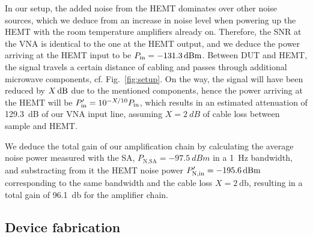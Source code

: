 In our setup, the added noise from the HEMT dominates over other noise sources, which we deduce from an increase in noise level when powering up the HEMT with the room temperature amplifiers already on.
% 
Therefore, the SNR at the VNA is identical to the one at the HEMT output, and we deduce the power arriving at the HEMT input to be $P_{\rm in}=\SI{-131.3}{dBm}$. 
% 
Between DUT and HEMT, the signal travels a certain distance of cabling and passes through additional microwave components, cf. Fig.~\ref{fig:setup}.
% 
On the way, the signal will have been reduced by $X {\,\rm dB}$ due to the mentioned components, hence the power arriving at the HEMT will be $P_{\rm in}^\prime = 10^{-X/10} P_{\rm in}$, which results in an estimated attenuation of \SI{129.3}{dB} of our VNA input line, assuming $X=\SI{2}{dB}$ of cable loss between sample and HEMT.

We deduce the total gain of our amplification chain by calculating the average noise power measured with the SA, $P_\text{N,SA}=\SI{-97.5}{dBm}$ in a \SI{1}{\hertz} bandwidth, and substracting from it the HEMT noise power $P_{\rm N,in}^\prime=\SI{-195.6}{dBm}$ corresponding to the same bandwidth and the cable loss $X=\SI{2}{\decibel}$, resulting in a total gain of \SI{96.1}{\decibel} for the amplifier chain.

\subsection{Device fabrication}\label{sec:fabrication}

